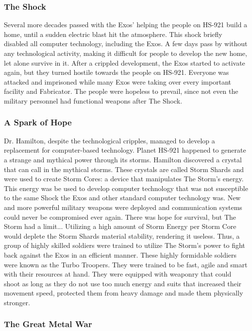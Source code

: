 \documentclass[12pt]{article}
\begin{document}
\subsubsection{The Shock}

Several more decades passed with the Exos' helping the people on HS-921 build a home, until a sudden electric blast hit the atmosphere. This shock briefly disabled all computer technology, including the Exos. A few days pass by without any technological activity, making it difficult for people to develop the new home, let alone survive in it. After a crippled development, the Exos started to activate again, but they turned hostile towards the people on HS-921. Everyone was attacked and imprisoned while many Exos were taking over every important facility and Fabricator. The people were hopeless to prevail, since not even the military personnel had functional weapons after The Shock. 

\subsubsection{A Spark of Hope}

Dr. Hamilton, despite the technological cripples, managed to develop a replacement for computer-based technology. Planet HS-921 happened to generate a strange and mythical power through its storms. Hamilton  discovered a crystal that can call in the mythical storms. These crystals are called Storm Shards and were used to create Storm Cores: a device that manipulates The Storm's energy. This energy was be used to develop computer technology that was not susceptible to the same Shock the Exos and other standard computer technology was. New and more powerful military weapons were deployed and communication systems could never be compromised ever again. There was hope for survival, but The Storm had a limit... Utilizing a high amount of Storm Energy per Storm Core would deplete the Storm Shards material stability, rendering it useless. Thus, a group of highly skilled soldiers were trained to utilize The Storm's power to fight back against the Exos in an efficient manner. These highly formidable soldiers were known as the Turbo Troopers. They were trained to be fast, agile and smart with their resources at hand. They were equipped with weaponry that could shoot as long as they do not use too much energy and suits that increased their movement speed, protected them from heavy damage and made them physically stronger. 

\subsubsection{The Great Metal War}
\end{document}
